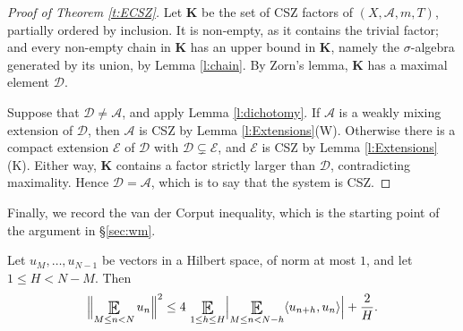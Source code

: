 \begin{proof}[Proof of Theorem \ref{t:ECSZ}]
Let $\mathbf K$ be the set of CSZ factors of $(X,\mathcal A,m,T)$, partially ordered by inclusion.  
It is non-empty, as it contains the trivial factor; and every non-empty chain in $\mathbf K$ has an upper bound in $\mathbf K$, namely the $\sigma$-algebra generated by its union, by Lemma \ref{l:chain}.  
By Zorn's lemma, $\mathbf K$ has a maximal element $\mathcal D$.  

Suppose that $\mathcal D \neq \mathcal A$, and apply Lemma \ref{l:dichotomy}.  
If $\mathcal A$ is a weakly mixing extension of $\mathcal D$, then $\mathcal A$ is CSZ by Lemma \ref{l:Extensions}(W).  
Otherwise there is a compact extension $\mathcal E$ of $\mathcal D$ with $\mathcal D \subsetneq \mathcal E$, and $\mathcal E$ is CSZ by Lemma \ref{l:Extensions}(K).  
Either way, $\mathbf K$ contains a factor strictly larger than $\mathcal D$, contradicting maximality.  
Hence $\mathcal D = \mathcal A$, which is to say that the system is CSZ.  
\end{proof}


Finally, we record the van der Corput inequality, which is the starting point of the argument in \S\ref{sec:wm}. 

\begin{lemma}  \label{vdC}
Let $u_M, \ldots, u_{N-1}$ be vectors in a Hilbert space, of norm at most $1$, and let $1\leq H < N-M$.  Then 
\begin{equation}
    \label{vdc} 
\Bigl\lVert \Expectation_{M\leq n <N} u_n \Bigr\rVert ^2 
\leq 
4\, \Expectation_{1\leq h\leq H} 
\Bigl\lvert 
\Expectation_{M\leq n <N-h} \langle u_{n+h}, u_n\rangle  
\Bigr\rvert
+ \frac 2H . 
\end{equation}
\end{lemma}

